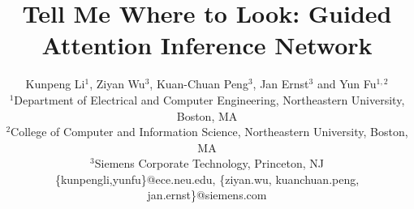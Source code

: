 \documentclass[10pt,twocolumn,letterpaper]{article}
\begin{document}
\title{Tell Me Where to Look: Guided Attention Inference Network}

\author{
   Kunpeng Li$^{1}$, Ziyan Wu$^{3}$, Kuan-Chuan Peng$^{3}$, Jan Ernst$^{3}$ and Yun Fu$^{1,2}$\\
   $^1$Department of Electrical and Computer Engineering, Northeastern University, Boston, MA\\
   $^2$College of Computer and Information Science, Northeastern University, Boston, MA\\
   $^3$Siemens Corporate Technology, Princeton, NJ\\
   \small{\{kunpengli,yunfu\}@ece.neu.edu, \{ziyan.wu, kuanchuan.peng, jan.ernst\}@siemens.com}
}


\maketitle
\end{document}
